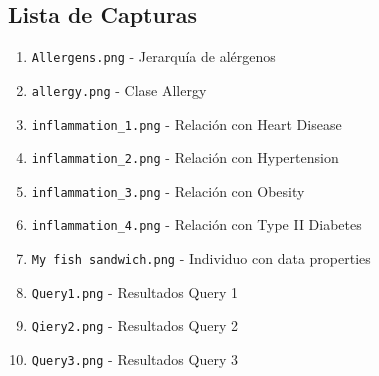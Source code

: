 \documentclass[12pt,a4paper]{article}
\begin{document}
\subsection{Lista de Capturas}

\begin{enumerate}
    \item \texttt{Allergens.png} - Jerarquía de alérgenos
    \item \texttt{allergy.png} - Clase Allergy
    \item \texttt{inflammation\_1.png} - Relación con Heart Disease
    \item \texttt{inflammation\_2.png} - Relación con Hypertension
    \item \texttt{inflammation\_3.png} - Relación con Obesity
    \item \texttt{inflammation\_4.png} - Relación con Type II Diabetes
    \item \texttt{My fish sandwich.png} - Individuo con data properties
    \item \texttt{Query1.png} - Resultados Query 1
    \item \texttt{Qiery2.png} - Resultados Query 2
    \item \texttt{Query3.png} - Resultados Query 3
\end{enumerate}

\end{document}
